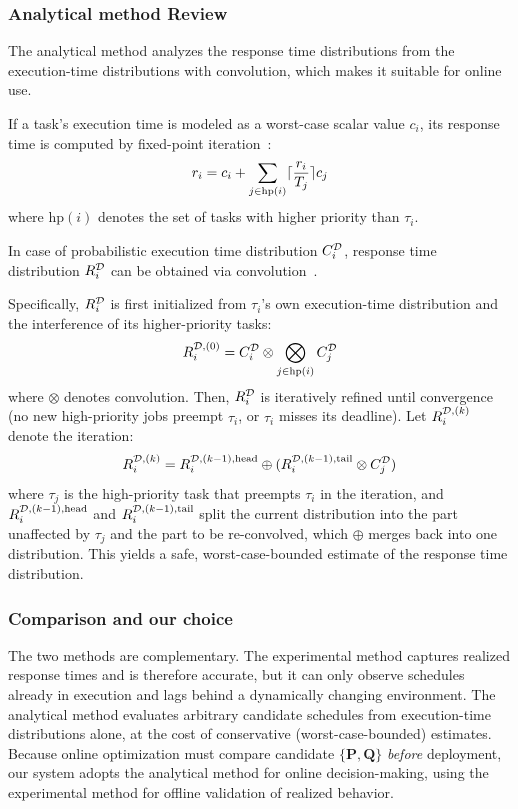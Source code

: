 \subsubsection{Analytical method Review}
    \label{section_rta}
    The analytical method analyzes the response time distributions from the execution-time distributions with convolution, which makes it suitable for online use.

    If a task’s execution time is modeled as a worst-case scalar value $c_i$, its response time is computed by fixed-point iteration~\cite{Joseph1986FindingRT}:
	\begin{equation}
		r_i = c_i +\sum_{j \in \text{hp}(i)} \lceil\frac{r_i}{T_j}\rceil{c_j}
        \label{eq: rta_scalar}
	\end{equation}
    where $\text{hp}(i)$ denotes the set of tasks with higher priority than $\tau_i$.

	In case of probabilistic execution time distribution $C_{i}^{\mathcal{D}}$, response time distribution $R_{i}^{\mathcal{D}}$ can be obtained via convolution~\cite{Maxim2013ResponseTA, Maxim2022ProbabilisticA}.

    Specifically, $R_{i}^{\mathcal{D}}$ is first initialized from $\tau_i$'s own execution-time distribution and the interference of its higher-priority tasks:
	\begin{equation}
		R_{i}^{\mathcal{D},(0)} = C_{i}^{\mathcal{D}} \otimes \bigotimes_{j \in \text{hp}(i)} C_{j}^{\mathcal{D}}
	\end{equation}
	where $\otimes$ denotes convolution.
    Then, $R_{i}^{\mathcal{D}}$ is iteratively refined until convergence (\ie no new high-priority jobs preempt $\tau_i$, or $\tau_i$ misses its deadline).
    Let $R_{i}^{\mathcal{D},(k)}$ denote the  iteration:
	\begin{equation}
		R_{i}^{\mathcal{D},(k)} = R_{i}^{\mathcal{D},(k-1),\mathrm{head}} \oplus (R_{i}^{\mathcal{D},(k-1),\mathrm{tail}} \otimes C_{j}^{\mathcal{D}})
		\label{eq_prob_rta}
	\end{equation}
	where $\tau_j$ is the high-priority task that preempts $\tau_i$ in the  iteration, and $R_{i}^{\mathcal{D},(k-1),\mathrm{head}}$ and $R_{i}^{\mathcal{D},(k-1),\mathrm{tail}}$ split the current distribution into the part unaffected by $\tau_j$ and the part to be re-convolved, which $\oplus$ merges back into one distribution.
    This yields a safe, worst-case-bounded estimate of the response time distribution.

\subsubsection{Comparison and our choice}
    The two methods are complementary. 
	The experimental method captures realized response times and is therefore accurate, but it can only observe schedules already in execution and lags behind a dynamically changing environment. 
	The analytical method evaluates arbitrary candidate schedules from execution-time distributions alone, at the cost of conservative (worst-case-bounded) estimates. 
	Because online optimization must compare candidate $\{\boldsymbol{P},\boldsymbol{Q}\}$ \emph{before} deployment, our system adopts the analytical method for online decision-making, using the experimental method for offline validation of realized behavior.

